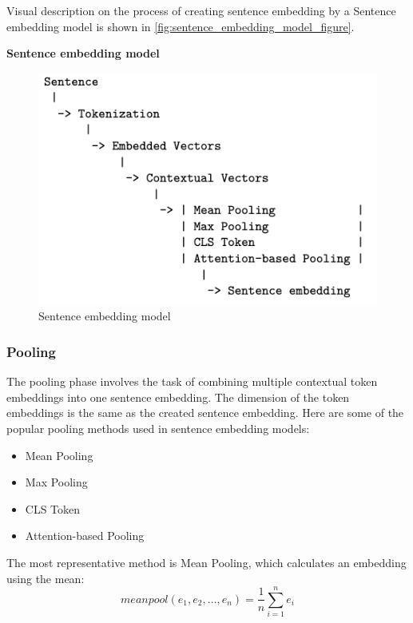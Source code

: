 \documentclass{wseas}
\begin{document}
Visual description on the process of creating sentence embedding by a 
Sentence embedding model is shown in \autoref{fig:sentence_embedding_model_figure}.

\textbf{Sentence embedding model}

\begin{figure}[htbp]
  \centering
  \includegraphics[width=\linewidth]{resources/v1/sentenceEmbeddingModelCreation.png}
  \caption{Sentence embedding model}
  \label{fig:sentence_embedding_model_figure}
\end{figure}

\subsubsection{Pooling}

The pooling phase involves the task of combining multiple contextual
token embeddings into one sentence embedding. The dimension of the token
embeddings is the same as the created sentence embedding. Here are some
of the popular pooling methods used in sentence embedding models:

\begin{itemize}

\item
  Mean Pooling
\item
  Max Pooling
\item
  CLS Token
\item
  Attention-based Pooling
\end{itemize}

The most representative method is Mean Pooling, which calculates an
embedding using the mean:
\begin{equation}
  meanpool(e_1, e_2, \ldots, e_n) = \frac{1}{n} \sum_{i=1}^{n} e_i
\end{equation}
\end{document}
